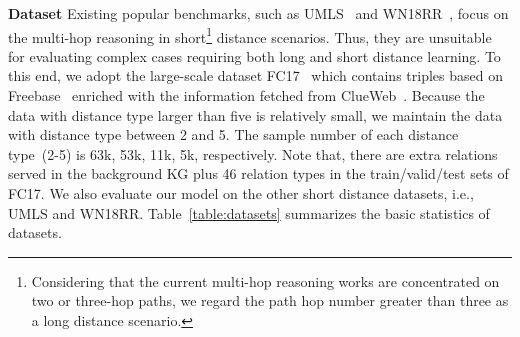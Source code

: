 \textbf{Dataset}
Existing popular benchmarks, such as UMLS~\cite{umls2007} and WN18RR~\cite{Dettmers2018Convolutional}, 
focus on the multi-hop reasoning in short\footnote{
    Considering that the current multi-hop reasoning works are concentrated on two or three-hop paths, we regard the path hop number greater than three as a long distance scenario.}
distance scenarios.
Thus, they are unsuitable for evaluating %
complex cases requiring both long and short distance learning.
To this end, we adopt the large-scale dataset FC17~\cite{neelakantan2015compositional} %
which contains
triples based on Freebase~\cite{freebase2008} enriched with the information fetched from ClueWeb~\cite{clueweb2013}.
Because the data with distance type larger than five is relatively small,
we maintain the data with distance type between 2 and 5.
The sample number of each distance type~(2-5) %
is 63k, 53k, 11k, 5k, respectively.
Note that, there are extra relations served in the background KG plus 46 relation types in the train/valid/test sets of FC17.
We also evaluate our model on the other short distance datasets, i.e., UMLS and WN18RR. 
Table~\ref{table:datasets} summarizes the basic statistics of datasets.

